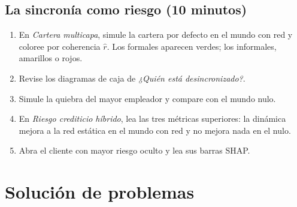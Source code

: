 \subsection{La sincronía como riesgo (10 minutos)}
\begin{enumerate}
\item En \emph{Cartera multicapa}, simule la cartera por defecto en el mundo con red y
coloree por coherencia $\hat r$. Los formales aparecen verdes; los informales, amarillos o
rojos.
\item Revise los diagramas de caja de \emph{¿Quién está desincronizado?}.
\item Simule la quiebra del mayor empleador y compare con el mundo nulo.
\item En \emph{Riesgo crediticio híbrido}, lea las tres métricas superiores: la dinámica
mejora a la red estática en el mundo con red y no mejora nada en el nulo.
\item Abra el cliente con mayor riesgo oculto y lea sus barras SHAP.
\end{enumerate}

\section{Solución de problemas}

